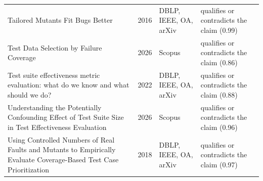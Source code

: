 \begin{longtable}{@{}%
  >{\raggedright\arraybackslash}p{}c%
  >{\raggedright\arraybackslash}p{}%
  >{\raggedright\arraybackslash}p{}@{}}
Tailored Mutants Fit Bugs Better & 2016 & DBLP, IEEE, OA, arXiv & qualifies or contradicts the claim (0.99) \\
Test Data Selection by Failure Coverage & 2026 & Scopus & qualifies or contradicts the claim (0.86) \\
Test suite effectiveness metric evaluation: what do we know and what should we do? & 2022 & DBLP, IEEE, OA, arXiv & qualifies or contradicts the claim (0.88) \\
Understanding the Potentially Confounding Effect of Test Suite Size in Test Effectiveness Evaluation & 2026 & Scopus & qualifies or contradicts the claim (0.96) \\
Using Controlled Numbers of Real Faults and Mutants to Empirically Evaluate Coverage-Based Test Case Prioritization & 2018 & DBLP, IEEE, OA, arXiv & qualifies or contradicts the claim (0.97) \\
\end{longtable}
\endgroup
